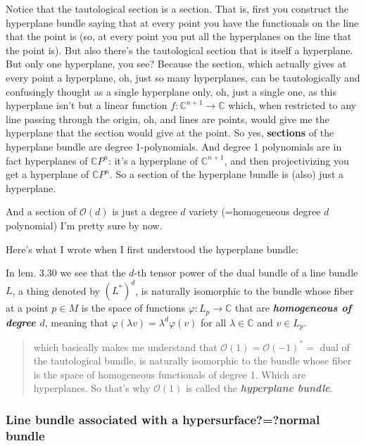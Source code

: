 Notice that the tautological section is a section. That is, first you construct the hyperplane bundle saying that at every point you have the functionals on the line that the point is (so, at every point you put all the hyperplanes on the line that the point is). But also there's the tautological section that is itself a hyperplane. But only one hyperplane, you see? Because the section, which actually gives at every point a hyperplane, oh, just so many hyperplanes, can be tautologically and confusingly thought as a single hyperplane only, oh, just a single one, as this hyperplane isn't but a linear function \(f:\mathbb{C}^{n+1}\to \mathbb{C}\) which, when restricted to any line passing through the origin, oh, and lines are points, would give me the hyperplane that the section would give at the point. So yes, \textbf{sections} of the hyperplane bundle are degree 1-polynomials. And degree 1 polynomials are in fact hyperplanes of \(\mathbb{C}P^n\): it's a hyperplane of \(\mathbb{C}^{n+1}\), and then projectivizing you get a hyperplane of \(\mathbb{C}P^n\). So a section of the hyperplane bundle is (also) just a hyperplane.

And a section of \(\mathcal{O}(d)\) is just a degree \(d\) variety (=homogeneous degree \(d\) polynomial) I'm pretty sure by now.


Here's what I wrote when I first understood the hyperplane bundle:

In lem. 3.30 \cite{lec} we see that the $d$-th tensor power of the dual bundle of a line bundle $L$, a thing denoted by $(L^*)^d$, is naturally isomorphic to the bundle whose fiber at a point $p \in M$ is the space of functions $\varphi:L_p\to \mathbb{C}$ that are \textit{\textbf{homogeneous of degree $d$}}, meaning that $\varphi(\lambda v)=\lambda^d \varphi(v)$ for all $\lambda \in \mathbb{C}$ and $v \in L_p$.

\begin{quotation}
	which basically makes me understand that $\mathcal{O}(1)=\mathcal{O}(-1)^*=$ dual of the tautological bundle, is naturally isomorphic to the bundle whose fiber is the space of homogeneous functionals of degree 1. Which are hyperplanes. So that's why $\mathcal{O}(1)$ is called the \textit{\textbf{hyperplane bundle}}.
\end{quotation}

\subsubsection*{Line bundle associated with a hypersurface?=?normal bundle}

